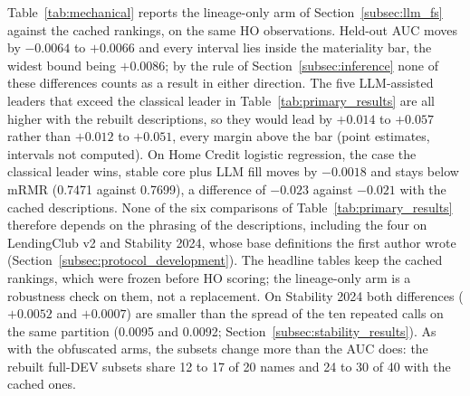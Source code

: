 \documentclass[final,5p,twocolumn]{elsarticle}
\begin{document}
Table~\ref{tab:mechanical} reports the lineage-only arm of Section~\ref{subsec:llm_fs} against the cached rankings, on the same HO observations. Held-out AUC moves by $-0.0064$ to $+0.0066$ and every interval lies inside the materiality bar, the widest bound being $+0.0086$; by the rule of Section~\ref{subsec:inference} none of these differences counts as a result in either direction. The five LLM-assisted leaders that exceed the classical leader in Table~\ref{tab:primary_results} are all higher with the rebuilt descriptions, so they would lead by $+0.014$ to $+0.057$ rather than $+0.012$ to $+0.051$, every margin above the bar (point estimates, intervals not computed). On Home Credit logistic regression, the case the classical leader wins, stable core plus LLM fill moves by $-0.0018$ and stays below mRMR (0.7471 against 0.7699), a difference of $-0.023$ against $-0.021$ with the cached descriptions. None of the six comparisons of Table~\ref{tab:primary_results} therefore depends on the phrasing of the descriptions, including the four on LendingClub v2 and Stability 2024, whose base definitions the first author wrote (Section~\ref{subsec:protocol_development}). The headline tables keep the cached rankings, which were frozen before HO scoring; the lineage-only arm is a robustness check on them, not a replacement. On Stability 2024 both differences ($+0.0052$ and $+0.0007$) are smaller than the spread of the ten repeated calls on the same partition (0.0095 and 0.0092; Section~\ref{subsec:stability_results}). As with the obfuscated arms, the subsets change more than the AUC does: the rebuilt full-DEV subsets share 12 to 17 of 20 names and 24 to 30 of 40 with the cached ones.
\end{document}
